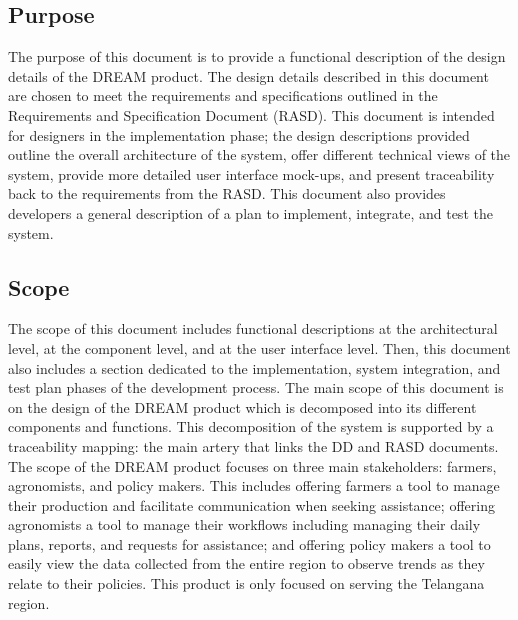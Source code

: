 \subsection{Purpose}
\noindent
The purpose of this document is to provide a functional description of the design details of the DREAM product. The design details described in this document are chosen to meet the requirements and specifications outlined in the Requirements and Specification Document (RASD). This document is intended for designers in the implementation phase; the design descriptions provided outline the overall architecture of the system, offer different technical views of the system, provide more detailed user interface mock-ups, and present traceability back to the requirements from the RASD. This document also provides developers a general description of a plan to implement, integrate, and test the system.

\subsection{Scope}
\noindent
The scope of this document includes functional descriptions at the architectural level, at the component level, and at the user interface level. Then, this document also includes a section dedicated to the implementation, system integration, and test plan phases of the development process. The main scope of this document is on the design of the DREAM product which is decomposed into its different components and functions. This decomposition of the system is supported by a traceability mapping: the main artery that links the DD and RASD documents. \\
The scope of the DREAM product focuses on three main stakeholders: farmers, agronomists, and policy makers. This includes offering farmers a tool to manage their production and facilitate communication when seeking assistance; offering agronomists a tool to manage their workflows including managing their daily plans, reports, and requests for assistance; and offering policy makers a tool to easily view the data collected from the entire region to observe trends as they relate to their policies. This product is only focused on serving the Telangana region. 

